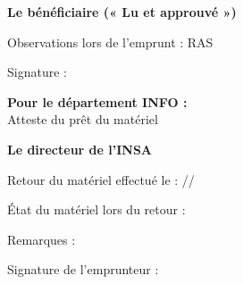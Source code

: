 \documentclass[12pt,a4paper]{article}
\begin{document}
\vspace{0.5cm}

\textbf{Le bénéficiaire (« Lu et approuvé »)} 

\vspace{0.4cm}

Observations lors de l’emprunt : RAS

\vspace{0.4cm}

Signature :

\vspace{0.3cm}

\begin{minipage}{0.5\linewidth} 
\end{minipage} 
\hfill 
\begin{minipage}{0.5\linewidth} 
\textbf{Pour le département INFO :} \\[0.3cm] 
Atteste du prêt du matériel \\[0.4cm] 
\begin{center} 
\textbf{Le directeur de l’INSA} \\ 
\end{center} 
\end{minipage}

\vspace{1.2cm}

Retour du matériel effectué le : \underline{\hspace{2cm}}/\underline{\hspace{2cm}}/\underline{\hspace{2cm}}

\vspace{0.5cm}

État du matériel lors du retour : \\

\vspace{0.25cm}

Remarques : \\

\vspace{0.4cm}

Signature de l’emprunteur :
\end{document}
